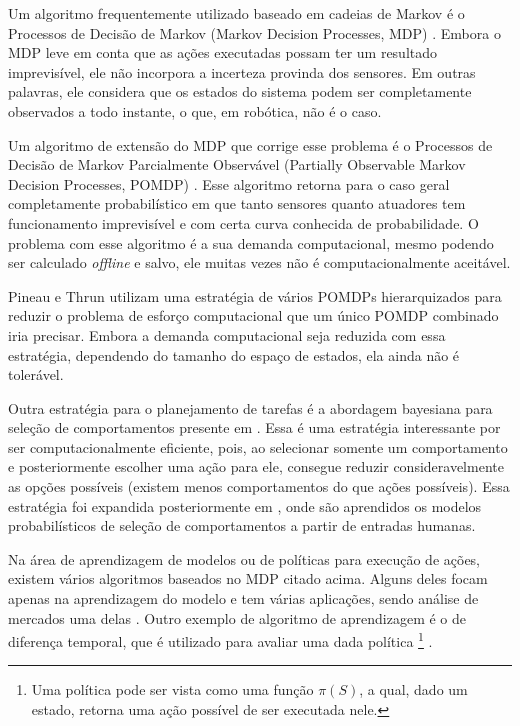 Um algoritmo frequentemente utilizado baseado em cadeias de Markov é o Processos de Decisão de Markov (Markov Decision Processes, MDP) \cite{Thrun:2005:PR:1121596}. Embora o MDP leve em conta que as ações executadas possam ter um resultado imprevisível, ele não incorpora a incerteza provinda dos sensores. Em outras palavras, ele considera que os estados do sistema podem ser completamente observados a todo instante, o que, em robótica, não é o caso.

Um algoritmo de extensão do MDP que corrige esse problema é o Processos de Decisão de Markov Parcialmente Observável (Partially Observable Markov Decision Processes, POMDP) \cite{Thrun:2005:PR:1121596}. Esse algoritmo retorna para o caso geral completamente probabilístico em que tanto sensores quanto atuadores tem funcionamento imprevisível e com certa curva conhecida de probabilidade. O problema com esse algoritmo é a sua demanda computacional, mesmo podendo ser calculado \textit{offline} e salvo, ele muitas vezes não é computacionalmente aceitável.

Pineau e Thrun \cite{Pineau01hierarchicalpomdp} utilizam uma estratégia de vários POMDPs hierarquizados para reduzir o problema de esforço computacional que um único POMDP combinado iria precisar. Embora a demanda computacional seja reduzida com essa estratégia, dependendo do tamanho do espaço de estados, ela ainda não é tolerável.

Outra estratégia para o planejamento de tarefas é a abordagem bayesiana para seleção de comportamentos presente em \cite{Koike:2005,lidoris2008}. Essa é uma estratégia interessante por ser computacionalmente eficiente, pois, ao selecionar somente um comportamento e posteriormente escolher uma ação para ele, consegue reduzir consideravelmente as opções possíveis (existem menos comportamentos do que ações possíveis). Essa estratégia foi expandida posteriormente em \cite{lidoris2011state}, onde são aprendidos os modelos probabilísticos de seleção de comportamentos a partir de entradas humanas.

Na área de aprendizagem de modelos ou de políticas para execução de ações, existem vários algoritmos baseados no MDP citado acima. Alguns deles focam apenas na aprendizagem do modelo \cite{calvet:hal-00674226,Gutmann_noise-contrastiveestimation} e tem várias aplicações, sendo análise de mercados uma delas \cite{calvet:hal-00674226}. Outro exemplo de algoritmo de aprendizagem é o de diferença temporal, que é utilizado para avaliar uma dada política%
\footnote{Uma política pode ser vista como uma função $ \pi \left( S \right) $, a qual, dado um estado, retorna uma ação possível de ser executada nele.%
}
\cite{Sutton:1988:LPM,Andreas:2007,sutton1998reinforcement}.

